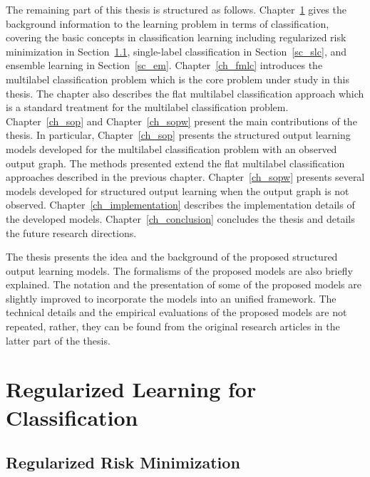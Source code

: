 The remaining part of this thesis is structured as follows.
Chapter~\ref{ch_rlc} gives the background information to the learning problem in terms of classification, covering the basic concepts in classification learning including regularized risk minimization in Section~\ref{sc_rrm}, single-label classification in Section~\ref{sc_slc}, and ensemble learning in Section~\ref{sc_em}.
Chapter~\ref{ch_fmlc} introduces the multilabel classification problem which is the core problem under study in this thesis.
The chapter also describes the flat multilabel classification approach which is a standard treatment for the multilabel classification problem.
Chapter~\ref{ch_sop} and Chapter~\ref{ch_sopw} present the main contributions of the thesis.
In particular, Chapter~\ref{ch_sop} presents the structured output learning models developed for the multilabel classification problem with an observed output graph.
The methods presented extend the flat multilabel classification approaches described in the previous chapter.
Chapter~\ref{ch_sopw} presents several models developed for structured output learning when the output graph is not observed.
Chapter~\ref{ch_implementation} describes the implementation details of the developed models.
Chapter~\ref{ch_conclusion} concludes the thesis and details the future research directions.

The thesis presents the idea and the background of the proposed structured output learning models.
The formalisms of the proposed models are also briefly explained.
The notation and the presentation of some of the proposed models are slightly improved to incorporate the models into an unified framework.
The technical details and the empirical evaluations of the proposed models are not repeated, rather, they can be found from the original research articles in the latter part of the thesis.



%
%
%
\chapter{Regularized Learning for Classification} \label{ch_rlc}



%
\section{Regularized Risk Minimization}\label{sc_rrm}

